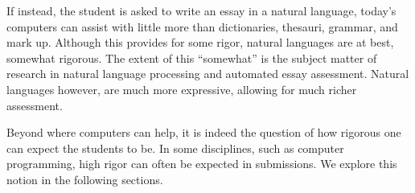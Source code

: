 If instead, the student is asked to write an essay in a natural language,
today's computers can assist with little more than dictionaries, thesauri,
grammar, and mark up. Although this provides for some rigor, natural languages
are at best, somewhat rigorous.  The extent of this ``somewhat'' is the subject
matter of research in natural language processing and automated essay
assessment\cite{valenti-et-al-2003}. Natural languages however, are much more
expressive, allowing for much richer assessment\cite{conole-warburton-2005}.

Beyond where computers can help, it is indeed the question of how rigorous one
can expect the students to be. In some disciplines, such as computer
programming, high rigor can often be expected in submissions. We explore this
notion in the following sections.















